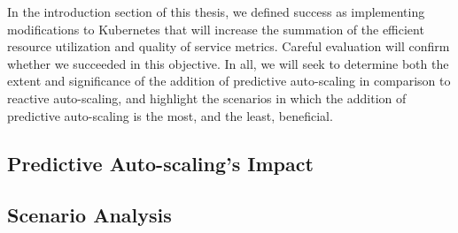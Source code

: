 In the introduction section of this thesis, we defined success as implementing
modifications to Kubernetes that will increase the summation of the
efficient resource utilization and quality of service metrics. Careful
evaluation will confirm whether we succeeded in this objective. In all, we will
seek to determine both the extent and significance of the addition of predictive
auto-scaling in comparison to reactive auto-scaling,
and highlight the scenarios in which the addition
of predictive auto-scaling is the most, and the least, beneficial.

\subsection{Predictive Auto-scaling's Impact}



\subsection{Scenario Analysis}


